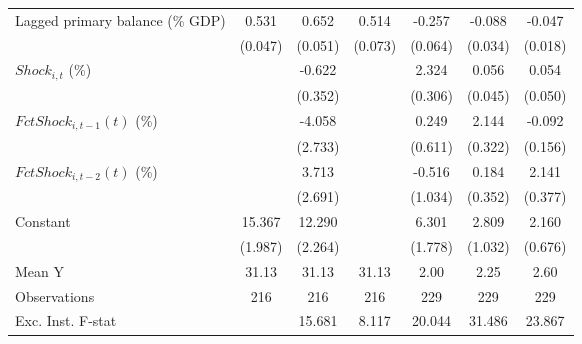 {\begin{tabular}{l*{6}{c}}
\addlinespace
Lagged primary balance (\% GDP)&       0.531\sym{***}&       0.652\sym{***}&       0.514\sym{***}&      -0.257\sym{***}&      -0.088\sym{**} &      -0.047\sym{**} \\
                    &     (0.047)         &     (0.051)         &     (0.073)         &     (0.064)         &     (0.034)         &     (0.018)         \\
\addlinespace
$ Shock_{i,t}$ (\%) &                     &      -0.622         &                     &       2.324\sym{***}&       0.056         &       0.054         \\
                    &                     &     (0.352)         &                     &     (0.306)         &     (0.045)         &     (0.050)         \\
\addlinespace
$ FctShock_{i,t-1}(t)$ (\%)&                     &      -4.058         &                     &       0.249         &       2.144\sym{***}&      -0.092         \\
                    &                     &     (2.733)         &                     &     (0.611)         &     (0.322)         &     (0.156)         \\
\addlinespace
$ FctShock_{i,t-2}(t)$ (\%)&                     &       3.713         &                     &      -0.516         &       0.184         &       2.141\sym{***}\\
                    &                     &     (2.691)         &                     &     (1.034)         &     (0.352)         &     (0.377)         \\
\addlinespace
Constant            &      15.367\sym{***}&      12.290\sym{***}&                     &       6.301\sym{***}&       2.809\sym{**} &       2.160\sym{***}\\
                    &     (1.987)         &     (2.264)         &                     &     (1.778)         &     (1.032)         &     (0.676)         \\
\midrule
Mean Y              &       31.13         &       31.13         &       31.13         &        2.00         &        2.25         &        2.60         \\
Observations        &         216         &         216         &         216         &         229         &         229         &         229         \\
Exc. Inst. F-stat   &                     &      15.681         &       8.117         &      20.044         &      31.486         &      23.867         \\
\bottomrule
\end{tabular}
}
